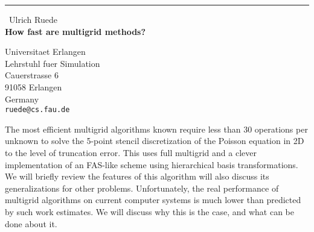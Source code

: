 \documentclass{report}
\begin{document}
\begin{center}
\rule{6in}{1pt} \
{\large Ulrich Ruede \\
{\bf How fast are multigrid methods?}}

Universitaet Erlangen \\ Lehrstuhl fuer Simulation \\ Cauerstrasse 6 \\ 91058 Erlangen \\ Germany
\\
{\tt ruede@cs.fau.de}\end{center}

The most efficient multigrid algorithms known require less than 30
operations per unknown to solve the 5-point stencil discretization of the
Poisson equation in 2D to the level of truncation error. This uses full
multigrid and a clever implementation of an FAS-like scheme using
hierarchical basis transformations.
We will briefly review the features of this algorithm will also discuss its
generalizations for other problems. Unfortunately, the real performance
of multigrid algorithms on current computer systems is much lower than
predicted by such work estimates. We will discuss why this is the case,
and what can be done about it.
\end{document}
